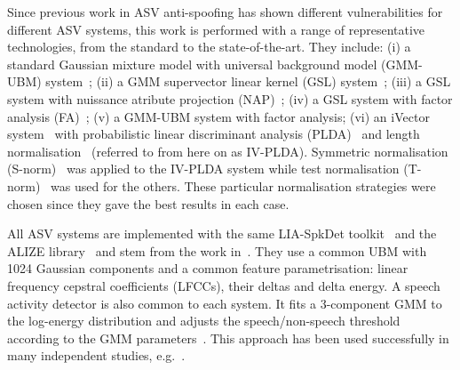 
Since previous work in ASV anti-spoofing has shown different vulnerabilities for different ASV systems, this work is performed with a range of representative technologies, from the standard to the state-of-the-art.
They include: 
(i) a standard Gaussian mixture model with universal background model (GMM-UBM) system~\cite{Reynolds2000};
(ii) a GMM supervector linear kernel (GSL) system~\cite{Campbell2006b};
(iii) a GSL system with nuissance atribute projection (NAP)~\cite{Campbell2006};
(iv) a GSL system with factor analysis (FA)~\cite{Fauve2007};
(v) a GMM-UBM system with factor analysis;
(vi) an iVector system~\cite{Dehak2011} with probabilistic linear discriminant analysis (PLDA)~\cite{Li2012} and length normalisation~\cite{Garcia2011} (referred to from here on as IV-PLDA). 
Symmetric normalisation (S-norm)~\cite{Kenny2010} was applied to the IV-PLDA system while test normalisation (T-norm)~\cite{Auckenthaler2000} was used for the others.  These particular normalisation strategies were chosen since they gave the best results in each case. 

All ASV systems are implemented with the same LIA-SpkDet toolkit~\cite{Bonastre2008} and the ALIZE library~\cite{Bonastre2004} and stem from the work in~\cite{Fauve2007}.
They use a common UBM with 1024 Gaussian components and a common feature parametrisation: linear frequency cepstral coefficients (LFCCs), their deltas and delta energy. 
A speech activity detector is also common to each system.  
It fits a 3-component GMM to the log-energy distribution and adjusts the speech/non-speech threshold according to the GMM parameters~\cite{Bimbot2004}.
This approach has been used successfully in many independent studies, e.g.~\cite{fauve2008}. 
